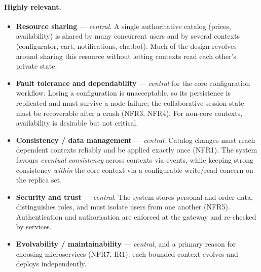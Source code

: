 \paragraph{Highly relevant.}
\begin{itemize}
  \item \textbf{Resource sharing} --- \emph{central}. A single authoritative
  catalog (prices, availability) is shared by many concurrent users and by
  several contexts (configurator, cart, notifications, chatbot). Much
  of the design revolves around sharing this resource without letting contexts
  read each other's private state.

  \item \textbf{Fault tolerance and dependability} --- \emph{central} for the
  core configuration workflow. Losing a configuration is unacceptable, so its
  persistence is replicated and must survive a node failure; the collaborative
  session state must be recoverable after a crash (NFR3, NFR4). For non-core
  contexts, availability is desirable but not critical.

  \item \textbf{Consistency / data management} --- \emph{central}. Catalog
  changes must reach dependent contexts reliably and be applied exactly once
  (NFR1). The system favours \emph{eventual consistency} across contexts via
  events, while keeping strong consistency \emph{within} the core context via a
  configurable write/read concern on the replica set.

  \item \textbf{Security and trust} --- \emph{central}. The system stores
  personal and order data, distinguishes roles, and must isolate users from one
  another (NFR5). Authentication and authorisation are enforced at the gateway
  and re-checked by services.

  \item \textbf{Evolvability / maintainability} --- \emph{central}, and a
  primary reason for choosing microservices (NFR7, IR1): each bounded context
  evolves and deploys independently.
\end{itemize}

